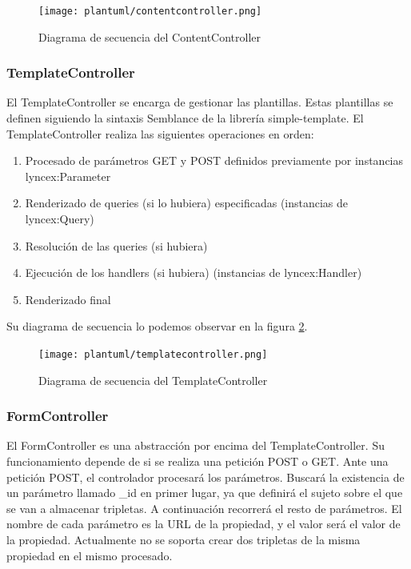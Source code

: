 \documentclass[openright,twoside,12pt]{book}
\begin{document}
\begin{figure}[h]
    \centering
    \texttt{[image: plantuml/contentcontroller.png]}
    \caption{Diagrama de secuencia del ContentController}
    \label{fig:contentcontroller}
\end{figure}

\subsubsection{TemplateController}
El TemplateController se encarga de gestionar las plantillas. Estas plantillas se definen siguiendo la sintaxis Semblance de la librería simple-template.
El TemplateController realiza las siguientes operaciones en orden:
\begin{enumerate}
    \item Procesado de parámetros GET y POST definidos previamente por instancias lyncex:Parameter
    \item Renderizado de queries (si lo hubiera) especificadas (instancias de lyncex:Query)
    \item Resolución de las queries (si hubiera)
    \item Ejecución de los handlers (si hubiera) (instancias de lyncex:Handler)
    \item Renderizado final
\end{enumerate}

Su diagrama de secuencia lo podemos observar en la figura \ref{fig:templatecontroller}.

\begin{figure}
    \centering
    \texttt{[image: plantuml/templatecontroller.png]}
    \caption{Diagrama de secuencia del TemplateController}
    \label{fig:templatecontroller}
\end{figure}

\subsubsection{FormController}
El FormController es una abstracción por encima del TemplateController.
Su funcionamiento depende de si se realiza una petición POST o GET. Ante una petición POST, el controlador procesará los parámetros.
Buscará la existencia de un parámetro llamado \_id en primer lugar, ya que definirá el sujeto sobre el que se van a almacenar tripletas.
A continuación recorrerá el resto de parámetros. El nombre de cada parámetro es la URL de la propiedad, y el valor será el valor de la propiedad.
Actualmente no se soporta crear dos tripletas de la misma propiedad en el mismo procesado.
\end{document}
